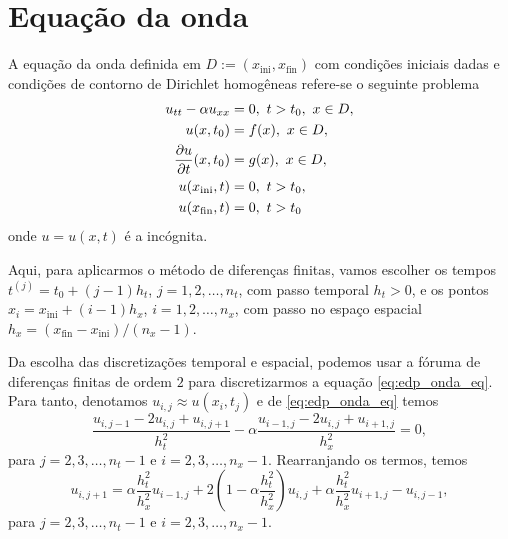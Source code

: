 \section{Equação da onda}\label{cap_edp_sec_onda}

A equação da onda definida em  $D := (x_{\text{ini}}, x_{\text{fin}})$ com condições iniciais dadas e condições de contorno de Dirichlet homogêneas refere-se o seguinte problema
\begin{align}
  u_{tt} - \alpha u_{xx} &= 0,~t>t_0,~x\in D, \label{eq:edp_onda_eq}\\
  u(x,t_0) &= f(x),~x\in D,\label{eq:edp_onda_ci1}\\
  \frac{\partial u}{\partial t}(x,t_0) &= g(x),~x\in D,\label{eq:edp_onda_ci2}\\
  u(x_{\text{ini}},t) &= 0,~t>t_0,\label{eq:edp_onda_bcxini}\\
  u(x_{\text{fin}},t) &= 0,~t>t_0\label{eq:edp_onda_bcxfin}
\end{align}
onde $u = u(x,t)$ é a incógnita.

Aqui, para aplicarmos o método de diferenças finitas, vamos escolher os tempos $t^{(j)} = t_0 + (j-1)h_t$, $j=1, 2, \dotsc, n_t$, com passo temporal $h_t>0$, e os pontos $x_i=x_{\text{ini}}+(i-1)h_x$, $i=1, 2, \dotsc, n_x$, com passo no espaço espacial $h_x = (x_{\text{fin}}-x_{\text{ini}})/(n_x-1)$.

Da escolha das discretizações temporal e espacial, podemos usar a fóruma de diferenças finitas de ordem $2$ para discretizarmos a equação \eqref{eq:edp_onda_eq}. Para tanto, denotamos $u_{i,j} \approx u(x_i,t_j)$ e de \eqref{eq:edp_onda_eq} temos
\begin{equation}
  \frac{u_{i,j-1}-2u_{i,j}+u_{i,j+1}}{h_t^2} - \alpha\frac{u_{i-1,j}-2u_{i,j}+u_{i+1,j}}{h_x^2} = 0,
\end{equation}
para $j=2, 3, \dotsc, n_t-1$ e $i=2, 3, \dotsc, n_x-1$. Rearranjando os termos, temos
\begin{equation}\label{eq:edp_onda_aux1}
  u_{i,j+1} = \alpha\frac{h_t^2}{h_x^2}u_{i-1,j} + 2\left(1-\alpha\frac{h_t^2}{h_x^2}\right)u_{i,j} + \alpha\frac{h_t^2}{h_x^2}u_{i+1,j} - u_{i,j-1},
\end{equation}
para $j=2, 3, \dotsc, n_t-1$ e $i=2, 3, \dotsc, n_x-1$.

